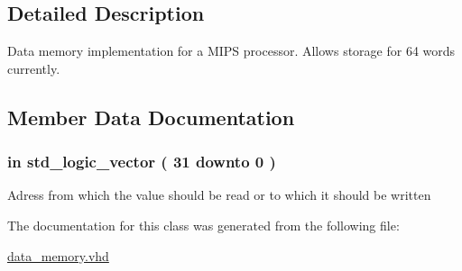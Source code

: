 \subsection{\-Detailed \-Description}
\-Data memory implementation for a \-M\-I\-P\-S processor. \-Allows storage for 64 words currently. 

\subsection{\-Member \-Data \-Documentation}
\hypertarget{classdata__memory_a2defa08e23fedc6207b33f767eada3aa}{
\subsubsection[{adress}]{ {\bfseries in } {\bfseries std\-\_\-logic\-\_\-vector (   31    downto    0  ) } }}\label{classdata__memory_a2defa08e23fedc6207b33f767eada3aa}
\-Adress from which the value should be read or to which it should be written 

\-The documentation for this class was generated from the following file\-:\begin{DoxyCompactItemize}
\item 
\hyperlink{data__memory_8vhd}{data\-\_\-memory.\-vhd}\end{DoxyCompactItemize}
